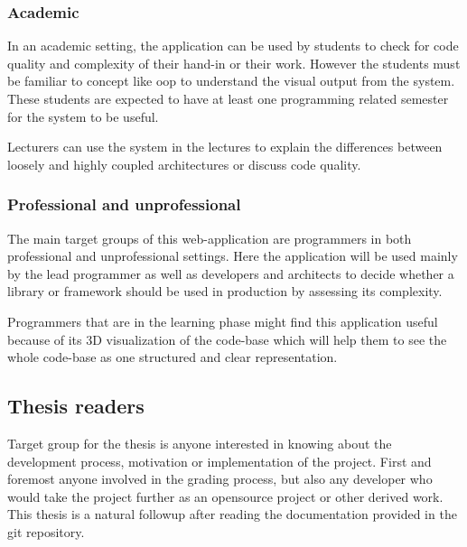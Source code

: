 \subsubsection{Academic}
In an academic setting, the application can be used by students to check for code quality and complexity of their hand-in or their work. However the students must be familiar to concept like \gls{oop} to understand the visual output from the system. These students are expected to have at least one programming related semester for the system to be useful. 

Lecturers can use the system in the lectures to explain the differences between loosely and highly coupled architectures or discuss code quality.

\subsubsection{Professional and unprofessional}
The main target groups of this web-application are programmers in both professional and unprofessional settings. Here the application will be used mainly by the lead programmer as well as developers and architects to decide whether a library or framework should be used in production by assessing its complexity. 

Programmers that are in the learning phase might find this application useful because of its 3D visualization of the code-base which will help them to see the whole code-base as one structured and clear representation.

\subsection{Thesis readers}
Target group for the thesis is anyone interested in knowing about the development process, motivation or implementation of the project. First and foremost anyone involved in the grading process, but also any developer who would take the project further as an \gls{opensource} project or other derived work.
This thesis is a natural followup after reading the documentation provided in the \gls{git} repository.
